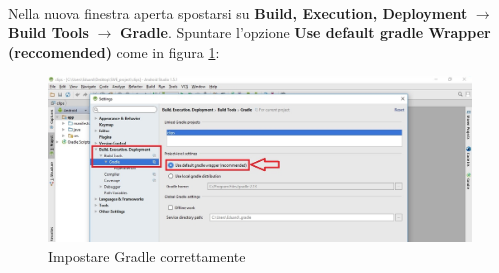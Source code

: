 \documentclass[../ManualeSviluppatore.tex]{subfiles}
\begin{document}
		\paragraph*{}
			Nella nuova finestra aperta spostarsi su \textbf{Build, Execution, Deployment} $\rightarrow$ \textbf{Build Tools} $\rightarrow$ \textbf{Gradle}. Spuntare l'opzione \textbf{Use default gradle \gls{Wrapper} (reccomended)} come in figura \ref{fig:SetGradle}:
			
			\begin{figure} [h]
				\centering
				\includegraphics[width=\textwidth]{img/SetGradle}
				\caption{Impostare Gradle correttamente}
				\label{fig:SetGradle}
			\end{figure}
		
\end{document}
